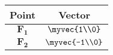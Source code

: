 \begin{tabular}[12pt]{ |c| c|}
    \hline
    \textbf{Point} & \textbf{Vector}\\ 
    \hline
    $\mathbf{F_1}$ &  $\myvec{1\\0}$\\
    \hline
    $\mathbf{F_2}$ &   $\myvec{-1\\0}$\\
    \hline
    \end{tabular}